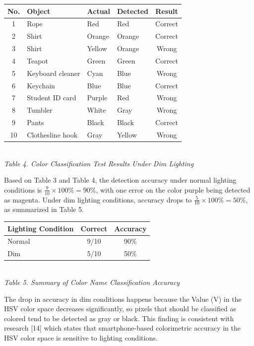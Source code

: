 \begin{table}[H]
  \centering
  {\scriptsize
  \begin{tabular}{|c|l|l|l|c|}
    \hline
    \textbf{No.} & \textbf{Object} & \textbf{Actual} & \textbf{Detected} & \textbf{Result} \\
    \hline
    1 & Rope & Red & Red & Correct \\ \hline
    2 & Shirt & Orange & Orange & Correct \\ \hline
    3 & Shirt & Yellow & Orange & Wrong \\ \hline
    4 & Teapot & Green & Green & Correct \\ \hline
    5 & Keyboard cleaner & Cyan & Blue & Wrong \\ \hline
    6 & Keychain & Blue & Blue & Correct \\ \hline
    7 & Student ID card & Purple & Red & Wrong \\ \hline
    8 & Tumbler & White & Gray & Wrong \\ \hline
    9 & Pants & Black & Black & Correct \\ \hline
    10 & Clothesline hook & Gray & Yellow & Wrong \\ \hline
  \end{tabular}}\\[0.3em]
  {\footnotesize\textit{Table 4. Color Classification Test Results Under Dim Lighting}}
\end{table}

Based on Table 3 and Table 4, the detection accuracy under normal lighting conditions is $\frac{9}{10} \times 100\% = 90\%$, with one error on the color purple being detected as magenta. Under dim lighting conditions, accuracy drops to $\frac{5}{10} \times 100\% = 50\%$, as summarized in Table 5.

\begin{table}[H]
  \centering
  {\footnotesize
  \begin{tabular}{|l|c|c|}
    \hline
    \textbf{Lighting Condition} & \textbf{Correct} & \textbf{Accuracy} \\
    \hline
    Normal & 9/10 & 90\% \\ \hline
    Dim & 5/10 & 50\% \\ \hline
  \end{tabular}}\\[0.3em]
  {\footnotesize\textit{Table 5. Summary of Color Name Classification Accuracy}}
\end{table}

The drop in accuracy in dim conditions happens because the Value (V) in the HSV color space decreases significantly, so pixels that should be classified as colored tend to be detected as gray or black. This finding is consistent with research [14] which states that smartphone-based colorimetric accuracy in the HSV color space is sensitive to lighting conditions.


